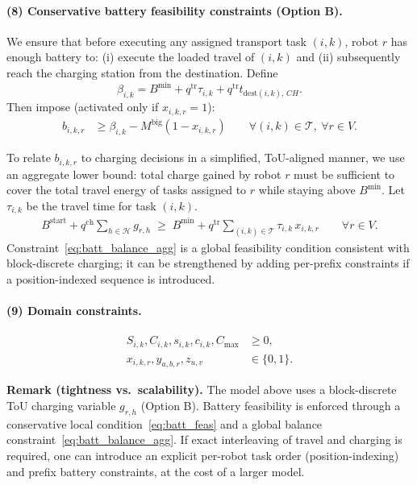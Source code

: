 \documentclass[preprint, 3p, review, 12pt]{elsarticle}
\begin{document}
\paragraph{(8) Conservative battery feasibility constraints (Option B).}
We ensure that before executing any assigned transport task $(i,k)$, robot $r$ has enough battery to:
(i) execute the loaded travel of $(i,k)$ and (ii) subsequently reach the charging station from the destination.
Define
\[
\beta_{i,k}=B^{\min} + q^{\mathrm{tr}}\tau_{i,k} + q^{\mathrm{tr}}t_{\mathrm{dest}(i,k),\,CH}.
\]
Then impose (activated only if $x_{i,k,r}=1$):
\begin{align}
b_{i,k,r} &\ge \beta_{i,k} - M^{\mathrm{big}}(1-x_{i,k,r})
\qquad \forall (i,k)\in\mathcal{T},\ \forall r\in V.
\label{eq:batt_feas}
\end{align}

To relate $b_{i,k,r}$ to charging decisions in a simplified, ToU-aligned manner,
we use an aggregate lower bound: total charge gained by robot $r$ must be sufficient to cover the total travel energy of tasks assigned to $r$ while staying above $B^{\min}$.
Let $\tau_{i,k}$ be the travel time for task $(i,k)$.
\begin{align}
B^{\mathrm{start}} + q^{\mathrm{ch}}\sum_{h\in\mathcal{H}} g_{r,h}
\;\ge\;
B^{\min} + q^{\mathrm{tr}}\sum_{(i,k)\in\mathcal{T}} \tau_{i,k}\,x_{i,k,r}
\qquad \forall r\in V.
\label{eq:batt_balance_agg}
\end{align}
Constraint~\eqref{eq:batt_balance_agg} is a global feasibility condition consistent with block-discrete charging;
it can be strengthened by adding per-prefix constraints if a position-indexed sequence is introduced.

\paragraph{(9) Domain constraints.}
\begin{align}
S_{i,k},C_{i,k},s_{i,k},c_{i,k},C_{\max} &\ge 0, \\
x_{i,k,r},y_{a,b,r},z_{u,v} &\in \{0,1\}.
\label{eq:domains}
\end{align}

\medskip
\noindent
\textbf{Remark (tightness vs.\ scalability).}
The model above uses a block-discrete ToU charging variable $g_{r,h}$ (Option B).
Battery feasibility is enforced through a conservative local condition~\eqref{eq:batt_feas} and a global balance constraint~\eqref{eq:batt_balance_agg}. If exact interleaving of travel and charging is required, one can introduce an explicit per-robot task order (position-indexing) and prefix battery constraints, at the cost of a larger model.
\end{document}
